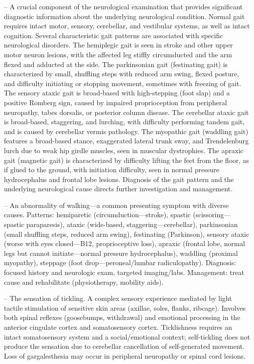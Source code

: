 -- A crucial component of the neurological examination that provides significant diagnostic information about the underlying neurological condition. Normal gait requires intact motor, sensory, cerebellar, and vestibular systems, as well as intact cognition. Several characteristic gait patterns are associated with specific neurological disorders. The hemiplegic gait is seen in stroke and other upper motor neuron lesions, with the affected leg stiffly circumducted and the arm flexed and adducted at the side. The parkinsonian gait (festinating gait) is characterized by small, shuffling steps with reduced arm swing, flexed posture, and difficulty initiating or stopping movement, sometimes with freezing of gait. The sensory ataxic gait is broad-based with high-stepping (foot slap) and a positive Romberg sign, caused by impaired proprioception from peripheral neuropathy, tabes dorsalis, or posterior column disease. The cerebellar ataxic gait is broad-based, staggering, and lurching, with difficulty performing tandem gait, and is caused by cerebellar vermis pathology. The myopathic gait (waddling gait) features a broad-based stance, exaggerated lateral trunk sway, and Trendelenburg lurch due to weak hip girdle muscles, seen in muscular dystrophies. The apraxic gait (magnetic gait) is characterized by difficulty lifting the feet from the floor, as if glued to the ground, with initiation difficulty, seen in normal pressure hydrocephalus and frontal lobe lesions. Diagnosis of the gait pattern and the underlying neurological cause directs further investigation and management.

-- An abnormality of walking—a common presenting symptom with diverse causes. Patterns: hemiparetic (circumduction—stroke), spastic (scissoring—spastic paraparesis), ataxic (wide-based, staggering—cerebellar), parkinsonian (small shuffling steps, reduced arm swing), festinating (Parkinson), sensory ataxic (worse with eyes closed—B12, proprioceptive loss), apraxic (frontal lobe, normal legs but cannot initiate—normal pressure hydrocephalus), waddling (proximal myopathy), steppage (foot drop—peroneal/lumbar radiculopathy). Diagnosis: focused history and neurologic exam, targeted imaging/labs. Management: treat cause and rehabilitate (physiotherapy, mobility aids).

-- The sensation of tickling. A complex sensory experience mediated by light tactile stimulation of sensitive skin areas (axillae, soles, flanks, ribcage). Involves both spinal reflexes (goosebumps, withdrawal) and emotional processing in the anterior cingulate cortex and somatosensory cortex. Ticklishness requires an intact somatosensory system and a social/emotional context; self-tickling does not produce the sensation due to cerebellar cancellation of self-generated movement. Loss of gargalesthesia may occur in peripheral neuropathy or spinal cord lesions.

